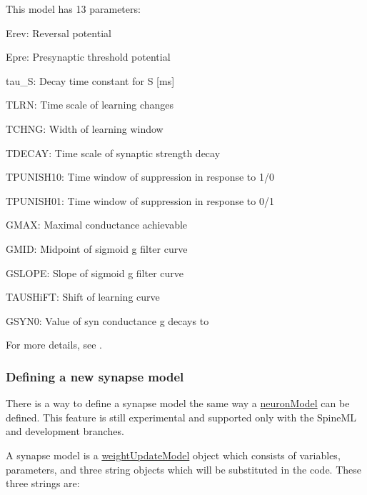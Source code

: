 This model has 13 parameters\+:
\begin{DoxyItemize}
\item {\ttfamily Erev\+:} Reversal potential
\item {\ttfamily Epre\+:} Presynaptic threshold potential
\item {\ttfamily tau\+\_\+\+S\+:} Decay time constant for S \mbox{[}ms\mbox{]}
\item {\ttfamily T\+L\+R\+N\+:} Time scale of learning changes
\item {\ttfamily T\+C\+H\+N\+G\+:} Width of learning window
\item {\ttfamily T\+D\+E\+C\+A\+Y\+:} Time scale of synaptic strength decay
\item {\ttfamily T\+P\+U\+N\+I\+S\+H10\+:} Time window of suppression in response to 1/0
\item {\ttfamily T\+P\+U\+N\+I\+S\+H01\+:} Time window of suppression in response to 0/1
\item {\ttfamily G\+M\+A\+X\+:} Maximal conductance achievable
\item {\ttfamily G\+M\+I\+D\+:} Midpoint of sigmoid g filter curve
\item {\ttfamily G\+S\+L\+O\+P\+E\+:} Slope of sigmoid g filter curve
\item {\ttfamily T\+A\+U\+S\+Hi\+F\+T\+:} Shift of learning curve
\item {\ttfamily G\+S\+Y\+N0\+:} Value of syn conductance g decays to
\end{DoxyItemize}

For more details, see \cite{nowotny2005self}.\hypertarget{UserManual_sec_sect34}{}\subsubsection{Defining a new synapse model}\label{UserManual_sec_sect34}
There is a way to define a synapse model the same way a \hyperlink{structneuronModel}{neuron\+Model} can be defined. This feature is still experimental and supported only with the Spine\+M\+L and development branches.

A synapse model is a \hyperlink{classweightUpdateModel}{weight\+Update\+Model} object which consists of variables, parameters, and three string objects which will be substituted in the code. These three strings are\+:


